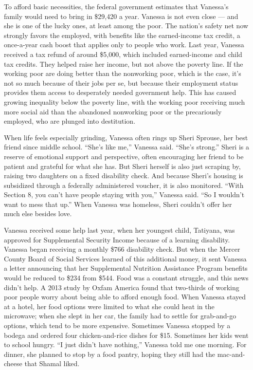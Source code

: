 To afford basic necessities, the federal government estimates that
Vanessa's family would need to bring in \$29,420 a year. Vanessa is not
even close --- and she is one of the lucky ones, at least among the
poor. The nation's safety net now strongly favors the employed, with
benefits like the earned-income tax credit, a once-a-year cash boost
that applies only to people who work. Last year, Vanessa received a tax
refund of around \$5,000, which included earned-income and child tax
credits. They helped raise her income, but not above the poverty line.
If the working poor are doing better than the nonworking poor, which is
the case, it's not so much because of their jobs per se, but because
their employment status provides them access to desperately needed
government help. This has caused growing inequality below the poverty
line, with the working poor receiving much more social aid than the
abandoned nonworking poor or the precariously employed, who are plunged
into destitution.

When life feels especially grinding, Vanessa often rings up Sheri
Sprouse, her best friend since middle school. ``She's like me,'' Vanessa
said. ``She's strong.'' Sheri is a reserve of emotional support and
perspective, often encouraging her friend to be patient and grateful for
what she has. But Sheri herself is also just scraping by, raising two
daughters on a fixed disability check. And because Sheri's housing is
subsidized through a federally administered voucher, it is also
monitored. ``With Section 8, you can't have people staying with you,''
Vanessa said. ``So I wouldn't want to mess that up.'' When Vanessa was
homeless, Sheri couldn't offer her much else besides love.

Vanessa received some help last year, when her youngest child, Tatiyana,
was approved for Supplemental Security Income because of a learning
disability. Vanessa began receiving a monthly \$766 disability check.
But when the Mercer County Board of Social Services learned of this
additional money, it sent Vanessa a letter announcing that her
Supplemental Nutrition Assistance Program benefits would be reduced to
\$234 from \$544. Food was a constant struggle, and this news didn't
help. A 2013 study by Oxfam America found that two-thirds of working
poor people worry about being able to afford enough food. When Vanessa
stayed at a hotel, her food options were limited to what she could heat
in the microwave; when she slept in her car, the family had to settle
for grab-and-go options, which tend to be more expensive. Sometimes
Vanessa stopped by a bodega and ordered four chicken-and-rice dishes for
\$15. Sometimes her kids went to school hungry. ``I just didn't have
nothing,'' Vanessa told me one morning. For dinner, she planned to stop
by a food pantry, hoping they still had the mac-and-cheese that Shamal
liked.

